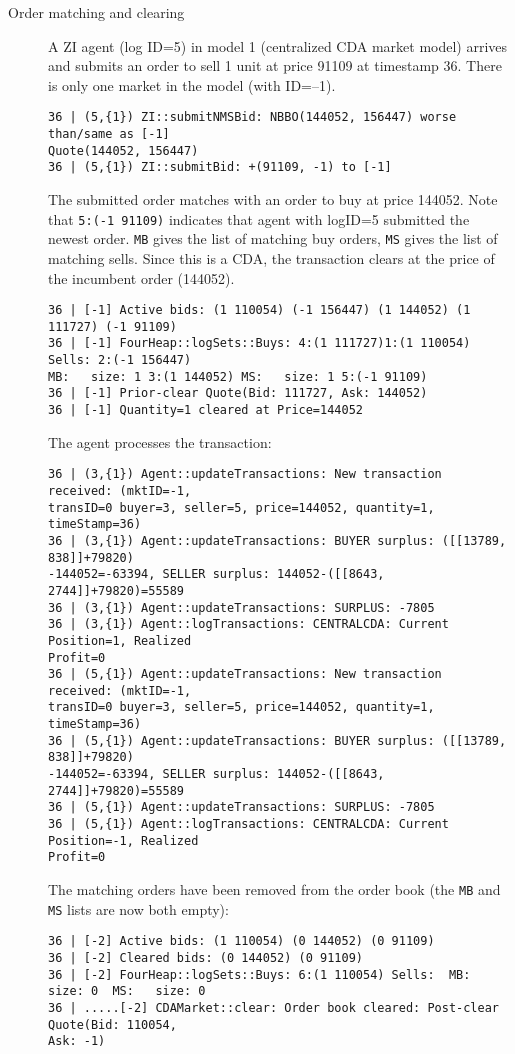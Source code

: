 \documentclass[11pt]{article}
\begin{document}
\begin{description}
\item[Order matching and clearing]
A ZI agent (log ID=5) in model 1 (centralized CDA market model) arrives and submits an order to sell 1 unit at price 91109 at timestamp 36. There is only one market in the model (with ID=--1).
\begin{verbatim}
36 | (5,{1}) ZI::submitNMSBid: NBBO(144052, 156447) worse than/same as [-1] 
Quote(144052, 156447)
36 | (5,{1}) ZI::submitBid: +(91109, -1) to [-1]
\end{verbatim}
%
%
The submitted order matches with an order to buy at price 144052. Note that \texttt{5:(-1 91109)} indicates that agent with logID=5 submitted the newest order. \texttt{MB} gives the list of matching buy orders, \texttt{MS} gives the list of matching sells. Since this is a CDA, the transaction clears at the price of the incumbent order (144052).
%
\begin{verbatim}
36 | [-1] Active bids: (1 110054) (-1 156447) (1 144052) (1 111727) (-1 91109)
36 | [-1] FourHeap::logSets::Buys: 4:(1 111727)1:(1 110054) Sells: 2:(-1 156447) 
MB:   size: 1 3:(1 144052) MS:   size: 1 5:(-1 91109)
36 | [-1] Prior-clear Quote(Bid: 111727, Ask: 144052)
36 | [-1] Quantity=1 cleared at Price=144052
\end{verbatim}
%
%
The agent processes the transaction:
\begin{verbatim}
36 | (3,{1}) Agent::updateTransactions: New transaction received: (mktID=-1, 
transID=0 buyer=3, seller=5, price=144052, quantity=1, timeStamp=36)
36 | (3,{1}) Agent::updateTransactions: BUYER surplus: ([[13789, 838]]+79820)
-144052=-63394, SELLER surplus: 144052-([[8643, 2744]]+79820)=55589
36 | (3,{1}) Agent::updateTransactions: SURPLUS: -7805
36 | (3,{1}) Agent::logTransactions: CENTRALCDA: Current Position=1, Realized 
Profit=0
36 | (5,{1}) Agent::updateTransactions: New transaction received: (mktID=-1, 
transID=0 buyer=3, seller=5, price=144052, quantity=1, timeStamp=36)
36 | (5,{1}) Agent::updateTransactions: BUYER surplus: ([[13789, 838]]+79820)
-144052=-63394, SELLER surplus: 144052-([[8643, 2744]]+79820)=55589
36 | (5,{1}) Agent::updateTransactions: SURPLUS: -7805
36 | (5,{1}) Agent::logTransactions: CENTRALCDA: Current Position=-1, Realized 
Profit=0
\end{verbatim}

%
The matching orders have been removed from the order book (the \texttt{MB} and \texttt{MS} lists are now both empty):
\begin{verbatim}
36 | [-2] Active bids: (1 110054) (0 144052) (0 91109)
36 | [-2] Cleared bids: (0 144052) (0 91109)
36 | [-2] FourHeap::logSets::Buys: 6:(1 110054) Sells:  MB:   size: 0  MS:   size: 0
36 | .....[-2] CDAMarket::clear: Order book cleared: Post-clear Quote(Bid: 110054, 
Ask: -1)
\end{verbatim}

\end{description}
\end{document}
